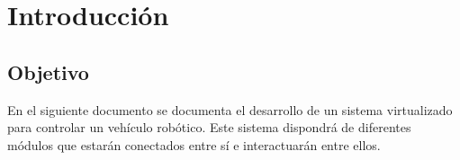 \chapter{Introducción}

	\section{Objetivo}
	En el siguiente documento se documenta el desarrollo de un sistema virtualizado para controlar un vehículo robótico. Este sistema dispondrá de diferentes módulos que estarán conectados entre sí e interactuarán entre ellos.